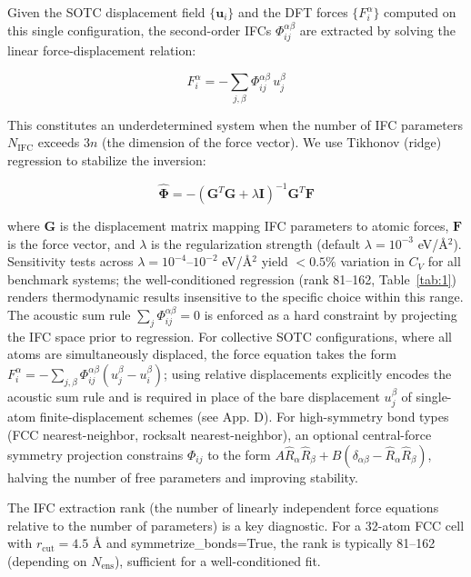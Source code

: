 \documentclass[aps,prb,reprint,amsmath,amssymb,floatfix]{revtex4-2}
\begin{document}
Given the SOTC displacement field \(\{\mathbf{u}_i\}\) and the DFT
forces \(\{F_i^\alpha\}\) computed on this single configuration, the
second-order IFCs \(\Phi_{ij}^{\alpha\beta}\) are extracted by solving
the linear force-displacement relation:

\begin{equation}
F_i^\alpha = -\sum_{j,\beta} \Phi_{ij}^{\alpha\beta}\, u_j^\beta \tag{6}
\end{equation}

This constitutes an underdetermined system when the number of IFC
parameters \(N_\text{IFC}\) exceeds \(3n\) (the dimension of the force
vector). We use Tikhonov (ridge) regression to stabilize the inversion:

\begin{equation}
\hat{\boldsymbol{\Phi}} = -\left(\mathbf{G}^T\mathbf{G} + \lambda\mathbf{I}\right)^{-1} \mathbf{G}^T \mathbf{F} \tag{7}
\end{equation}

where \(\mathbf{G}\) is the displacement matrix mapping IFC parameters
to atomic forces, \(\mathbf{F}\) is the force vector, and \(\lambda\) is
the regularization strength (default \(\lambda = 10^{-3}\) eV/Å\(^2\)).
Sensitivity tests across \(\lambda = 10^{-4}\)--\(10^{-2}\) eV/Å\(^2\)
yield \(< 0.5\%\) variation in \(C_V\) for all benchmark systems; the
well-conditioned regression (rank 81--162, Table~\ref{tab:1}) renders thermodynamic
results insensitive to the specific choice within this range. The
acoustic sum rule \(\sum_j \Phi_{ij}^{\alpha\beta} = 0\) is enforced as
a hard constraint by projecting the IFC space prior to regression. For
collective SOTC configurations, where all atoms are simultaneously
displaced, the force equation takes the form
\(F_i^\alpha = -\sum_{j,\beta}\Phi_{ij}^{\alpha\beta}(u_j^\beta - u_i^\beta)\);
using relative displacements explicitly encodes the acoustic sum rule
and is required in place of the bare displacement \(u_j^\beta\) of
single-atom finite-displacement schemes (see App. D). For high-symmetry
bond types (FCC nearest-neighbor, rocksalt nearest-neighbor), an
optional central-force symmetry projection constrains \(\Phi_{ij}\) to
the form
\(A\hat{R}_\alpha\hat{R}_\beta + B(\delta_{\alpha\beta} - \hat{R}_\alpha\hat{R}_\beta)\),
halving the number of free parameters and improving stability.

The IFC extraction rank (the number of linearly independent force
equations relative to the number of parameters) is a key diagnostic. For
a 32-atom FCC cell with \(r_\text{cut} = 4.5\) Å and
symmetrize\_bonds=True, the rank is typically 81--162 (depending on $N_\text{ens}$), sufficient for a
well-conditioned fit.
\end{document}
